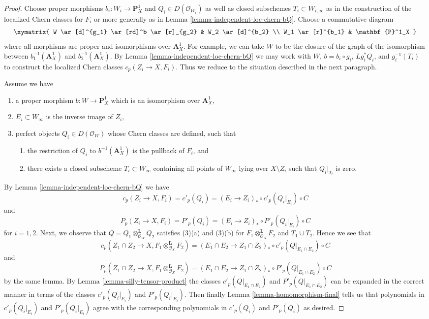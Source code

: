\begin{proof}
Choose proper morphisms $b_i : W_i \to \mathbf{P}^1_X$ and
$Q_i \in D(\mathcal{O}_{W_i})$ as well as closed subschemes
$T_i \subset W_{i, \infty}$ as in the construction of
the localized Chern classes for $F_i$ or more generally as in
Lemma \ref{lemma-independent-loc-chern-bQ}. Choose a commutative
diagram
$$
\xymatrix{
W \ar[d]^{g_1} \ar[rd]^b \ar[r]_{g_2} & W_2 \ar[d]^{b_2} \\
W_1 \ar[r]^{b_1} & \mathbf{P}^1_X
}
$$
where all morphisms are proper and isomorphisms over
$\mathbf{A}^1_X$. For example, we can take $W$ to be the closure
of the graph of the isomorphism between
$b_1^{-1}(\mathbf{A}^1_X)$ and $b_2^{-1}(\mathbf{A}^1_X)$.
By Lemma \ref{lemma-independent-loc-chern-bQ} we may work with
$W$, $b = b_i \circ g_i$, $Lg_i^*Q_i$, and
$g_i^{-1}(T_i)$ to construct the localized Chern classes
$c_p(Z_i \to X, F_i)$. Thus we reduce to the situation described
in the next paragraph.

\medskip\noindent
Assume we have
\begin{enumerate}
\item a proper morphism $b : W \to \mathbf{P}^1_X$ which is an isomorphism
over $\mathbf{A}^1_X$,
\item $E_i \subset W_\infty$ is the inverse image of $Z_i$,
\item perfect objects $Q_i \in D(\mathcal{O}_W)$ whose Chern classes
are defined, such that
\begin{enumerate}
\item the restriction of $Q_i$ to $b^{-1}(\mathbf{A}^1_X)$ is
the pullback of $F_i$, and
\item there exists a closed subscheme $T_i \subset W_\infty$ containing
all points of $W_\infty$ lying over $X \setminus Z_i$ such that
$Q_i|_{T_i}$ is zero.
\end{enumerate}
\end{enumerate}
By Lemma \ref{lemma-independent-loc-chern-bQ} we have
$$
c_p(Z_i \to X, F_i) = c'_p(Q_i) =
(E_i \to Z_i)_* \circ c'_p(Q_i|_{E_i}) \circ C
$$
and
$$
P_p(Z_i \to X, F_i) = P'_p(Q_i) =
(E_i \to Z_i)_* \circ P'_p(Q_i|_{E_i}) \circ C
$$
for $i = 1, 2$. Next, we observe that
$Q = Q_1 \otimes_{\mathcal{O}_W}^\mathbf{L} Q_2$
satisfies (3)(a) and (3)(b) for $F_1 \otimes_{\mathcal{O}_X}^\mathbf{L} F_2$
and $T_1 \cup T_2$. Hence we see that
$$
c_p(Z_1 \cap Z_2 \to X, F_1 \otimes_{\mathcal{O}_X}^\mathbf{L} F_2) =
(E_1 \cap E_2 \to Z_1 \cap Z_2)_* \circ
c'_p(Q|_{E_1 \cap E_2}) \circ C
$$
and
$$
P_p(Z_1 \cap Z_2 \to X, F_1 \otimes_{\mathcal{O}_X}^\mathbf{L} F_2) =
(E_1 \cap E_2 \to Z_1 \cap Z_2)_* \circ
P'_p(Q|_{E_1 \cap E_2}) \circ C
$$
by the same lemma. By Lemma \ref{lemma-silly-tensor-product}
the classes $c'_p(Q|_{E_1 \cap E_2})$ and $P'_p(Q|_{E_1 \cap E_2})$
can be expanded in the correct manner in terms of the classes
$c'_p(Q_i|_{E_i})$ and $P'_p(Q_i|_{E_i})$. Then finally
Lemma \ref{lemma-homomorphism-final}
tells us that polynomials in $c'_p(Q_i|_{E_i})$ and $P'_p(Q_i|_{E_i})$
agree with the corresponding polynomials in
$c'_p(Q_i)$ and $P'_p(Q_i)$ as desired.
\end{proof}







